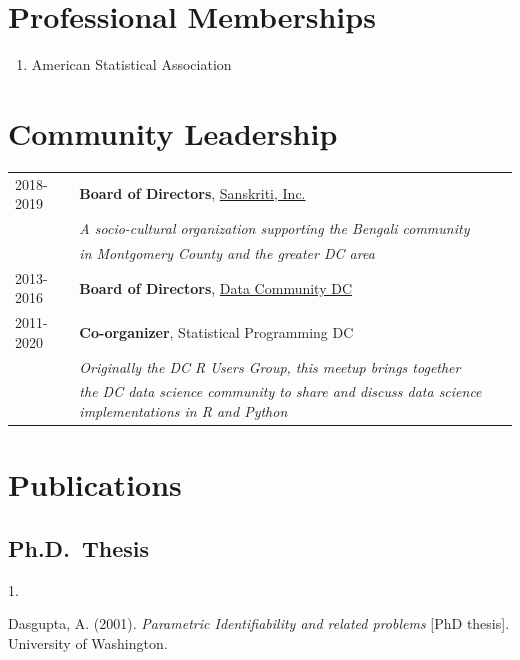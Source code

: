 \documentclass[10pt,letterpaper,]{article}
\providecommand{\tightlist}{%
  \setlength{\itemsep}{0pt}\setlength{\parskip}{0pt}}
\newlength{\cslhangindent}
\newlength{\csllabelwidth}
\newenvironment{CSLReferences}[2] %
 {\begin{list}{}{%
  \setlength{\itemindent}{0pt}
  \setlength{\leftmargin}{0pt}
  \setlength{\parsep}{0pt}
  \ifodd #1
   \setlength{\leftmargin}{\cslhangindent}
   \setlength{\itemindent}{-1\cslhangindent}
  \fi
  \setlength{\itemsep}{#2\baselineskip}}}
 {\end{list}}
\newcommand{\CSLLeftMargin}[1]{\parbox[t]{\csllabelwidth}{\strut#1\strut}}
\newcommand{\CSLRightInline}[1]{\parbox[t]{\linewidth - \csllabelwidth}{\strut#1\strut}}
\begin{document}
\section{Professional Memberships}\label{professional-memberships}

\begin{enumerate}
\def\labelenumi{\arabic{enumi}.}
\tightlist
\item
  American Statistical Association
\end{enumerate}

\section{Community Leadership}\label{community-leadership}

\begin{tabular}{ll}
  2018-2019 & \textbf{Board of Directors}, \href{http://www.sanskriti-dc.org}{Sanskriti, Inc.} \\ 
   & \emph{A socio-cultural organization supporting the Bengali community} \\ 
   & \emph{in Montgomery County and the greater DC area} \\ 
  2013-2016 & \textbf{Board of Directors}, \href{https://www.datacommunitydc.org}{Data Community DC} \\ 
  2011-2020 & \textbf{Co-organizer}, Statistical Programming DC \\ 
   & \emph{Originally the DC R Users Group, this meetup brings together} \\ 
   & \emph{the DC data science community to share and discuss data science implementations in R and Python} \\ 
  \end{tabular}

\section{Publications}\label{publications}

\subsection{Ph.D.~Thesis}\label{ph.d.-thesis}

\label{refs-62a838691798a1c4ca76e8035c2a30c5}
\begin{CSLReferences}{0}{0}
\CSLLeftMargin{1. }%
\CSLRightInline{Dasgupta, A. (2001). \emph{Parametric Identifiability
and related problems} {[}PhD thesis{]}. University of Washington.}

\end{CSLReferences}
\end{document}
